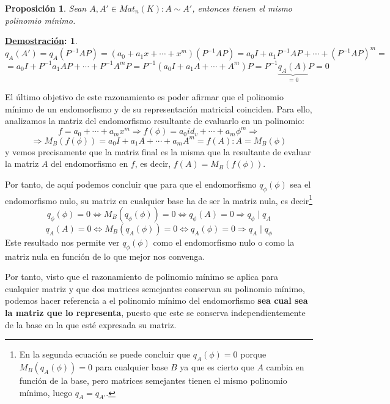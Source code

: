 \documentclass[10pt,a4paper,openright]{book}
\theoremstyle{break}
\newtheorem*{prop}{Proposición}
\newtheorem*{demo}{\underline{Demostración}:}
\begin{document}
\begin{prop}
Sean $A, A'\in Mat_n(K): A\sim A'$, entonces tienen el mismo polinomio mínimo.
\end{prop}
\begin{demo}
$$q_A(A')=q_A(P^{-1}AP)= (a_0+a_1x+\cdots+x^m)(P^{-1}AP)= a_0I+a_1P^{-1}AP+\cdots+(P^{-1}AP)^m= $$
$$= a_0I+P^{-1}a_1AP+\cdots+ P^{-1}A^mP= P^{-1}(a_0I+a_1A+\cdots+A^m)P = P^{-1}\underbrace{q_A(A)}_{=0}P = 0$$
\end{demo}

El último objetivo de este razonamiento es poder afirmar que el polinomio mínimo de un endomorfismo y de su representación matricial coinciden. Para ello, analizamos la matriz del endomorfismo resultante de evaluarlo en un polinomio:
$$f= a_0+\cdots+a_mx^m \Rightarrow f(\phi)= a_0 id_v+\cdots+a_m\phi^m\Rightarrow$$
$$\Rightarrow M_B(f(\phi))=a_0I+a_1A+\cdots+a_mA^m= f(A):A=M_B(\phi)$$
y vemos precisamente que la matriz final es la misma que la resultante de evaluar la matriz $A$ del endomorfismo en $f$, es decir, $f(A) = M_B(f(\phi))$.

Por tanto, de aquí podemos concluir que para que el endomorfismo $q_\phi(\phi)$ sea el endomorfismo nulo, su matriz en cualquier base ha de ser la matriz nula, es decir\footnote{En la segunda ecuación se puede concluir que $q_A(\phi) = 0$ porque $M_B(q_A(\phi)) = 0$ para cualquier base $B$ ya que es cierto que $A$ cambia en función de la base, pero matrices semejantes tienen el mismo polinomio mínimo, luego $q_A = q_{A'}$.}
$$q_\phi (\phi)=0\Leftrightarrow M_B(q_\phi(\phi))= 0\Leftrightarrow q_\phi(A)=0 \Rightarrow q_\phi \mid q_A$$
$$q_A(A) = 0 \Leftrightarrow M_B(q_A(\phi)) = 0 \Leftrightarrow q_A(\phi) = 0\Rightarrow q_A\mid q_\phi$$
Este resultado nos permite ver $q_\phi(\phi)$ como el endomorfismo nulo o como la matriz nula en función de lo que mejor nos convenga.

Por tanto, visto que el razonamiento de polinomio mínimo se aplica para cualquier matriz y que dos matrices semejantes conservan su polinomio mínimo, podemos hacer referencia a el polinomio mínimo del endomorfismo \textbf{sea cual sea la matriz que lo representa}, puesto que este se conserva independientemente de la base en la que esté expresada su matriz.
\end{document}
